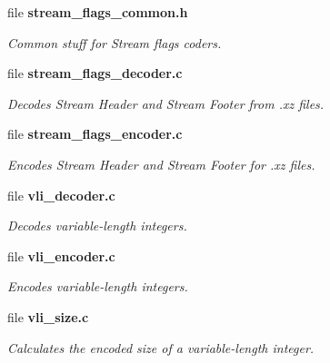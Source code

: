 \begin{DoxyCompactItemize}
file \textbf{ stream\+\_\+flags\+\_\+common.\+h}
\begin{DoxyCompactList}\small\item\em Common stuff for Stream flags coders. \end{DoxyCompactList}\item 
file \textbf{ stream\+\_\+flags\+\_\+decoder.\+c}
\begin{DoxyCompactList}\small\item\em Decodes Stream Header and Stream Footer from .xz files. \end{DoxyCompactList}\item 
file \textbf{ stream\+\_\+flags\+\_\+encoder.\+c}
\begin{DoxyCompactList}\small\item\em Encodes Stream Header and Stream Footer for .xz files. \end{DoxyCompactList}\item 
file \textbf{ vli\+\_\+decoder.\+c}
\begin{DoxyCompactList}\small\item\em Decodes variable-\/length integers. \end{DoxyCompactList}\item 
file \textbf{ vli\+\_\+encoder.\+c}
\begin{DoxyCompactList}\small\item\em Encodes variable-\/length integers. \end{DoxyCompactList}\item 
file \textbf{ vli\+\_\+size.\+c}
\begin{DoxyCompactList}\small\item\em Calculates the encoded size of a variable-\/length integer. \end{DoxyCompactList}\end{DoxyCompactItemize}
